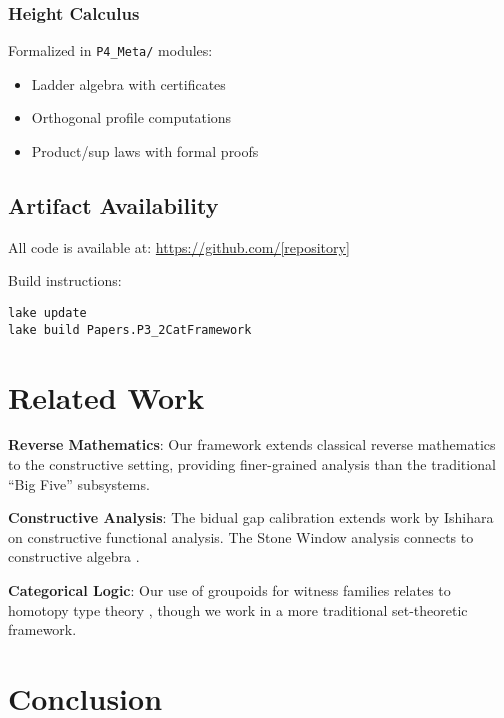 \documentclass[11pt]{article}
\begin{document}
\subsubsection{Height Calculus}

Formalized in \texttt{P4\_Meta/} modules:
\begin{itemize}
\item Ladder algebra with certificates
\item Orthogonal profile computations
\item Product/sup laws with formal proofs
\end{itemize}

\subsection{Artifact Availability}

All code is available at: \url{https://github.com/[repository]}

Build instructions:
\begin{verbatim}
lake update
lake build Papers.P3_2CatFramework
\end{verbatim}

\section{Related Work}

\textbf{Reverse Mathematics}: Our framework extends classical reverse mathematics \cite{Simpson} to the constructive setting, providing finer-grained analysis than the traditional ``Big Five'' subsystems.

\textbf{Constructive Analysis}: The bidual gap calibration extends work by Ishihara \cite{Ishihara} on constructive functional analysis. The Stone Window analysis connects to constructive algebra \cite{Mines}.

\textbf{Categorical Logic}: Our use of groupoids for witness families relates to homotopy type theory \cite{HoTT}, though we work in a more traditional set-theoretic framework.

\section{Conclusion}
\end{document}
